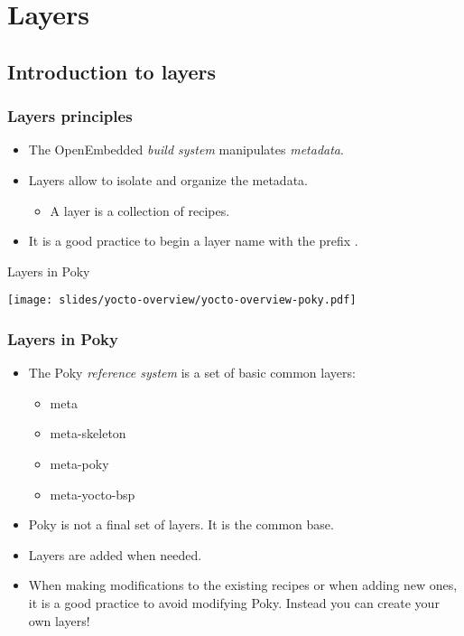 \section{Layers}

\subsection{Introduction to layers}

\begin{frame}
  \frametitle{Layers principles}
  \begin{itemize}
    \item The OpenEmbedded \emph{build system} manipulates
          \emph{metadata}.
    \item Layers allow to isolate and organize the metadata.
    \begin{itemize}
      \item A layer is a collection of recipes.
    \end{itemize}
    \item It is a good practice to begin a layer name with the prefix
      .
  \end{itemize}
\end{frame}

\begin{frame}{Layers in Poky}
  \begin{center}
    \texttt{[image: slides/yocto-overview/yocto-overview-poky.pdf]}
  \end{center}
\end{frame}

\begin{frame}
  \frametitle{Layers in Poky}
  \begin{itemize}
    \item The Poky \emph{reference system} is a set of basic common
          layers:
    \begin{itemize}
      \item meta
      \item meta-skeleton
      \item meta-poky
      \item meta-yocto-bsp
    \end{itemize}
    \item Poky is not a final set of layers. It is the common base.
    \item Layers are added when needed.
    \item When making modifications to the existing recipes or when
      adding new ones, it is a good practice to avoid modifying Poky.
      Instead you can create your own layers!
  \end{itemize}
\end{frame}

